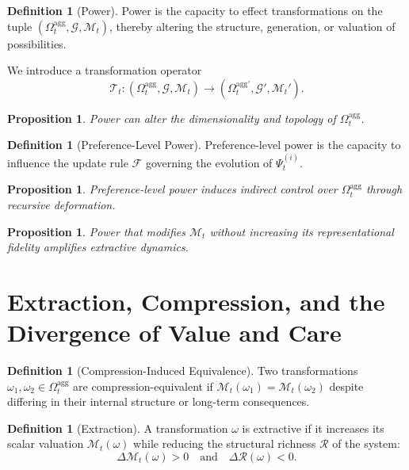 \documentclass[11pt,a4paper]{article}
\newtheorem{proposition}[theorem]{Proposition}
\theoremstyle{definition}
\newtheorem{definition}[theorem]{Definition}
\theoremstyle{remark}
\begin{document}
\begin{definition}[Power]
Power is the capacity to effect transformations on the tuple $(\Omega_t^{\mathrm{agg}}, \mathcal{G}, \mathcal{M}_t)$, thereby altering the structure, generation, or valuation of possibilities.
\end{definition}

We introduce a transformation operator
\[
\mathcal{T}_t : (\Omega_t^{\mathrm{agg}}, \mathcal{G}, \mathcal{M}_t) \rightarrow (\Omega_t^{\mathrm{agg}\prime}, \mathcal{G}', \mathcal{M}_t').
\]

\begin{proposition}
Power can alter the dimensionality and topology of $\Omega_t^{\mathrm{agg}}$.
\end{proposition}

\begin{definition}[Preference-Level Power]
Preference-level power is the capacity to influence the update rule $\mathcal{F}$ governing the evolution of $\Psi_t^{(i)}$.
\end{definition}

\begin{proposition}
Preference-level power induces indirect control over $\Omega_t^{\mathrm{agg}}$ through recursive deformation.
\end{proposition}

\begin{proposition}
Power that modifies $\mathcal{M}_t$ without increasing its representational fidelity amplifies extractive dynamics.
\end{proposition}

\section{Extraction, Compression, and the Divergence of Value and Care}

\begin{definition}[Compression-Induced Equivalence]
Two transformations $\omega_1, \omega_2 \in \Omega_t^{\mathrm{agg}}$ are compression-equivalent if $\mathcal{M}_t(\omega_1) = \mathcal{M}_t(\omega_2)$ despite differing in their internal structure or long-term consequences.
\end{definition}

\begin{definition}[Extraction]
A transformation $\omega$ is extractive if it increases its scalar valuation $\mathcal{M}_t(\omega)$ while reducing the structural richness $\mathcal{R}$ of the system:
\[
\Delta \mathcal{M}_t(\omega) > 0 \quad \text{and} \quad \Delta \mathcal{R}(\omega) < 0.
\]
\end{definition}
\end{document}
